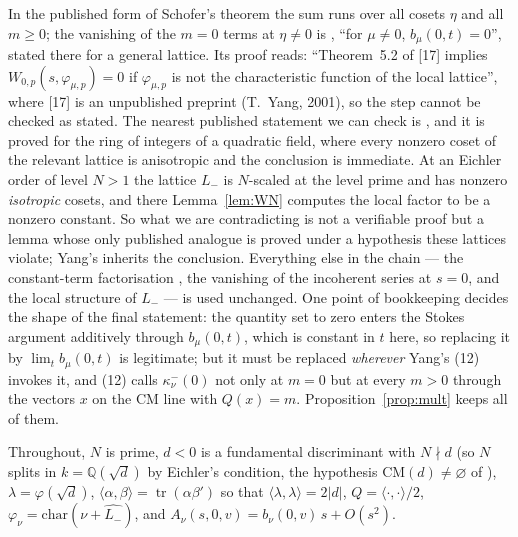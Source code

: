\documentclass[11pt,reqno]{amsart}
\theoremstyle{plain}
\theoremstyle{definition}
\DeclareMathOperator{\tr}{tr}
\newcommand{\Q}{\mathbb{Q}}
\newcommand{\Lm}{L_{-}}
\begin{document}
In the published form of Schofer's theorem \cite[Thm.~1.1]{Schofer} the sum runs over all cosets
$\eta$ and all $m\ge0$; the vanishing of the $m=0$ terms at $\eta\neq0$ is
\cite[Lemma~2.21]{Schofer}, ``for $\mu\neq0$, $b_\mu(0,t)=0$'', stated there for a general lattice.
Its proof reads: ``Theorem~5.2 of [17] implies $W_{0,p}(s,\varphi_{\mu,p})=0$ if $\varphi_{\mu,p}$
is not the characteristic function of the local lattice'', where [17] is an unpublished preprint
(T.~Yang, 2001), so the step cannot be checked as stated. The nearest published statement we can
check is \cite[Prop.~5.2]{KY}, and it is proved for the ring of integers of a quadratic field,
where every nonzero coset of the relevant lattice is anisotropic and the conclusion is immediate.
At an Eichler order of level $N>1$ the lattice $\Lm$ is $N$-scaled at the level prime and has
nonzero \emph{isotropic} cosets, and there Lemma~\ref{lem:WN} computes the local factor to be a
nonzero constant. So what we are contradicting is not a verifiable proof but a lemma whose only
published analogue is proved under a hypothesis these lattices violate; Yang's \cite[(11)]{Yang}
inherits the conclusion.
Everything else in the chain --- the constant-term factorisation \cite[Thm.~2.4]{KY}, the vanishing
of the incoherent series at $s=0$, and the local structure of $\Lm$ \cite[Lemma~18]{Yang} --- is
used unchanged. One point of bookkeeping decides the shape of the final statement: the quantity
set to zero enters the Stokes argument \cite[(33)]{Schofer} additively through $b_\mu(0,t)$, which
is constant in $t$ here, so replacing it by $\lim_tb_\mu(0,t)$ is legitimate; but it must be
replaced \emph{wherever} Yang's (12) invokes it, and (12) calls $\kappa^-_\nu(0)$ not only at
$m=0$ but at every $m>0$ through the vectors $x$ on the CM line with $Q(x)=m$.
Proposition~\ref{prop:mult} keeps all of them.

Throughout, $N$ is prime, $d<0$ is a fundamental discriminant with $N\nmid d$ (so $N$ splits in
$k=\Q(\sqrt d)$ by Eichler's condition, the hypothesis $\mathrm{CM}(d)\neq\varnothing$ of
\cite[Thm.~B]{GY}), $\lambda=\varphi(\sqrt d)$, $\langle\alpha,\beta\rangle=\tr(\alpha\beta')$ so
that $\langle\lambda,\lambda\rangle=2\lvert d\rvert$, $Q=\langle\cdot,\cdot\rangle/2$,
$\varphi_\nu=\mathrm{char}(\nu+\widehat{\Lm})$, and $A_\nu(s,0,v)=b_\nu(0,v)\,s+O(s^2)$.
\end{document}
